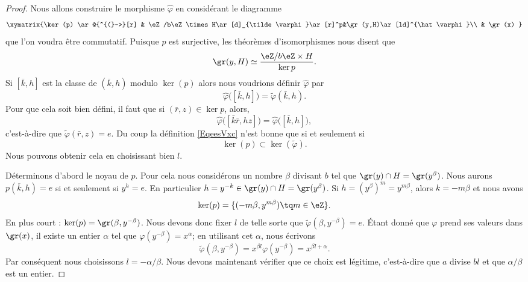 \begin{proof}
	Nous allons construire le morphisme \( \hat \varphi\) en considérant le diagramme
	\begin{equation}
		\xymatrix{%
			\ker(p) \ar@{^{(}->}[r]        &   \eZ/b\eZ\times H\ar[d]_{\tilde \varphi}\ar[r]^p&\gr(y,H)\ar[ld]^{\hat \varphi}\\
			&   \gr(x)
		}
	\end{equation}
	que l'on voudra être commutatif. Puisque \( p\) est surjective, les théorèmes d'isomorphismes nous disent que
	\begin{equation}
		\gr(y,H)\simeq\frac{ \eZ/b\eZ\times H }{ \ker p }.
	\end{equation}
	Si \( [\bar k,h]\) est la classe de \( (\bar k,h)\) modulo \( \ker(p)\) alors nous voudrions définir \( \hat \varphi\) par
	\begin{equation}        \label{EqeesVxc}
		\hat\varphi\big( [\bar k,h] \big)=\tilde \varphi(\bar k,h).
	\end{equation}
	Pour que cela soit bien défini, il faut que si \( (\bar r,z)\in \ker p\), alors,
	\begin{equation}
		\hat\varphi\big( [\bar k\bar r,hz] \big)=\hat\varphi\big( [\bar k,h] \big),
	\end{equation}
	c'est-à-dire que \( \tilde \varphi(\bar r,z)=e\). Du coup la définition \eqref{EqeesVxc} n'est bonne que si et seulement si
	\begin{equation}
		\ker(p)\subset\ker(\tilde\varphi ).
	\end{equation}
	Nous pouvons obtenir cela en choisissant bien \( l\).

	Déterminons d'abord le noyau de \( p\). Pour cela nous considérons un nombre \( \beta\) divisant \( b\) tel que \( \gr(y)\cap H=\gr(y^{\beta})\). Nous aurons \( p(\bar k,h)=e\) si et seulement si \( y^h=e\). En particulier \( h=y^{-k}\in\gr(y)\cap H=\gr(y^{\beta})\). Si \( h=(y^{\beta})^m=y^{m\beta}\), alors \( k=-m\beta\) et nous avons
	\begin{equation}
		\ker(p)=\{ (-m\beta,y^{m\beta})\tq m\in \eZ \}.
	\end{equation}
	En plus court : \( \ker(p)=\gr(\beta,y^{-\beta})\). Nous devons donc fixer \( l\) de telle sorte que \( \tilde \varphi(\beta,y^{-\beta})=e\). Étant donné que \( \varphi\) prend ses valeurs dans \( \gr(x)\), il existe un entier \( \alpha\) tel que \( \varphi(y^{-\beta})=x^{\alpha}\); en utilisant cet \( \alpha\), nous écrivons
	\begin{equation}
		\tilde \varphi(\beta,y^{-\beta})=x^{\beta l}\varphi(y^{-\beta})=x^{\beta l+\alpha}.
	\end{equation}
	Par conséquent nous choisissons \( l=-\alpha/\beta\). Nous devons maintenant vérifier que ce choix est légitime, c'est-à-dire que \( a\) divise \( bl\) et que \( \alpha/\beta\) est un entier.


\end{proof}
